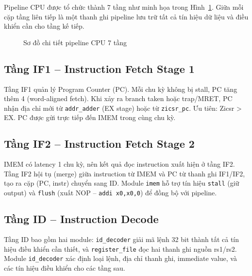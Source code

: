 Pipeline CPU được tổ chức thành 7 tầng như minh họa trong Hình~\ref{fig:pipeline-block}. Giữa mỗi cặp tầng liên tiếp là một thanh ghi pipeline lưu trữ tất cả tín hiệu dữ liệu và điều khiển cần cho tầng kế tiếp.

\begin{figure}[htp]
\centering
{}
\caption{Sơ đồ chi tiết pipeline CPU 7 tầng}
\label{fig:pipeline-block}
\end{figure}

\subsection{Tầng IF1 -- Instruction Fetch Stage 1}

Tầng IF1 quản lý Program Counter (PC). Mỗi chu kỳ không bị stall, PC tăng thêm 4 (word-aligned fetch). Khi xảy ra branch taken hoặc trap/MRET, PC nhận địa chỉ mới từ \texttt{addr\_adder} (EX stage) hoặc từ \texttt{zicsr\_pc}. Ưu tiên: Zicsr > EX. PC được gửi trực tiếp đến IMEM trong cùng chu kỳ.

\subsection{Tầng IF2 -- Instruction Fetch Stage 2}

IMEM có latency 1 chu kỳ, nên kết quả đọc instruction xuất hiện ở tầng IF2. Tầng IF2 hội tụ (merge) giữa instruction từ IMEM và PC từ thanh ghi IF1/IF2, tạo ra cặp (PC, instr) chuyển sang ID. Module \texttt{imem} hỗ trợ tín hiệu \texttt{stall} (giữ output) và \texttt{flush} (xuất NOP -- \texttt{addi x0,x0,0}) để đồng bộ với pipeline.

\subsection{Tầng ID -- Instruction Decode}

Tầng ID bao gồm hai module: \texttt{id\_decoder} giải mã lệnh 32 bit thành tất cả tín hiệu điều khiển cần thiết, và \texttt{register\_file} đọc hai thanh ghi nguồn rs1/rs2. Module \texttt{id\_decoder} xác định loại lệnh, địa chỉ thanh ghi, immediate value, và các tín hiệu điều khiển cho các tầng sau.

